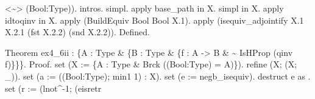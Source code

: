 \begin{coqdoccode}
\begin{coqdoccomment}
<\~{}>\coqdocindent{0.50em}
(Bool:Type)).\coqdoceol
\coqdocindent{1.00em}
intros.\coqdocindent{0.50em}
simpl.\coqdocindent{0.50em}
apply\coqdocindent{0.50em}
base\_path\coqdocindent{0.50em}
in\coqdocindent{0.50em}
X.\coqdocindent{0.50em}
simpl\coqdocindent{0.50em}
in\coqdocindent{0.50em}
X.\coqdoceol
\coqdocindent{1.00em}
apply\coqdocindent{0.50em}
idtoqinv\coqdocindent{0.50em}
in\coqdocindent{0.50em}
X.\coqdocindent{0.50em}
\coqdoceol
\coqdocindent{1.00em}
apply\coqdocindent{0.50em}
(BuildEquiv\coqdocindent{0.50em}
Bool\coqdocindent{0.50em}
Bool\coqdocindent{0.50em}
X.1).\coqdoceol
\coqdocindent{1.00em}
apply\coqdocindent{0.50em}
(isequiv\_adjointify\coqdocindent{0.50em}
X.1\coqdocindent{0.50em}
X.2.1\coqdocindent{0.50em}
(fst\coqdocindent{0.50em}
X.2.2)\coqdocindent{0.50em}
(snd\coqdocindent{0.50em}
X.2.2)).\coqdoceol
Defined.\coqdoceol
\end{coqdoccomment}
\coqdoceol
\coqdocemptyline
\coqdocnoindent
\begin{coqdoccomment}
\coqdoceol
Theorem\coqdocindent{0.50em}
ex4\_6ii\coqdocindent{0.50em}
:\coqdocindent{0.50em}
\{A\coqdocindent{0.50em}
:\coqdocindent{0.50em}
Type\coqdocindent{0.50em}
\&\coqdocindent{0.50em}
\{B\coqdocindent{0.50em}
:\coqdocindent{0.50em}
Type\coqdocindent{0.50em}
\&\coqdocindent{0.50em}
\{f\coqdocindent{0.50em}
:\coqdocindent{0.50em}
A\coqdocindent{0.50em}
->\coqdocindent{0.50em}
B\coqdocindent{0.50em}
\&\coqdocindent{0.50em}
\~{}\coqdocindent{0.50em}
IsHProp\coqdocindent{0.50em}
(qinv\coqdocindent{0.50em}
f)\}\}\}.\coqdoceol
Proof.\coqdoceol
\coqdocindent{1.00em}
set\coqdocindent{0.50em}
(X\coqdocindent{0.50em}
:=\coqdocindent{0.50em}
\{A\coqdocindent{0.50em}
:\coqdocindent{0.50em}
Type\coqdocindent{0.50em}
\&\coqdocindent{0.50em}
Brck\coqdocindent{0.50em}
((Bool:Type)\coqdocindent{0.50em}
=\coqdocindent{0.50em}
A)\}).\coqdoceol
\coqdocindent{1.00em}
refine\coqdocindent{0.50em}
(X;\coqdocindent{0.50em}
(X;\coqdocindent{0.50em}
\_)).\coqdoceol
\coqdocindent{1.00em}
set\coqdocindent{0.50em}
(a\coqdocindent{0.50em}
:=\coqdocindent{0.50em}
((Bool:Type);\coqdocindent{0.50em}
min1\coqdocindent{0.50em}
1)\coqdocindent{0.50em}
:\coqdocindent{0.50em}
X).\coqdoceol
\coqdocindent{1.00em}
set\coqdocindent{0.50em}
(e\coqdocindent{0.50em}
:=\coqdocindent{0.50em}
negb\_isequiv).\coqdocindent{0.50em}
destruct\coqdocindent{0.50em}
e\coqdocindent{0.50em}
as\coqdocindent{0.50em}
 .\coqdoceol
\coqdocindent{1.00em}
set\coqdocindent{0.50em}
(r\coqdocindent{0.50em}
:=\coqdocindent{0.50em}
(lnot\^{}-1;\coqdocindent{0.50em}
(eisretr\coqdocindent{0.50em}

\end{coqdoccomment}
\end{coqdoccode}
